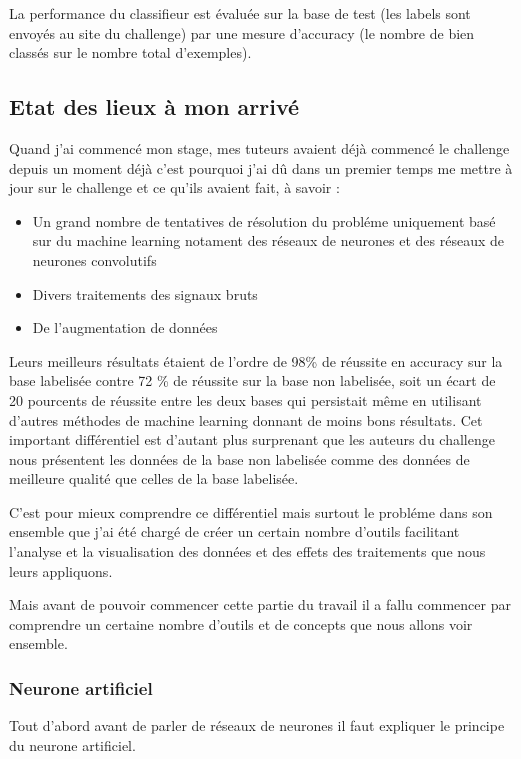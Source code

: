 La performance du classifieur est évaluée sur la base de test (les labels sont envoyés au site du challenge) par une mesure d'accuracy (le nombre de bien classés sur le nombre total d'exemples).

\hypertarget{Etat-des-lieux-lors-de-mon-arrivuxe9}{%
\subsection{Etat des lieux à mon arrivé}
\label{Etat-des-lieux-lors-de-mon-arrivuxe9}}

Quand j'ai commencé mon stage, mes tuteurs avaient déjà commencé le challenge depuis un moment déjà c'est pourquoi j'ai dû dans un premier temps me mettre à jour sur le challenge et ce qu'ils avaient fait, à savoir :
\begin{itemize}
\item Un grand nombre de tentatives de résolution du probléme uniquement basé sur du machine learning notament des réseaux de neurones et des réseaux de neurones convolutifs
\item Divers traitements des signaux bruts
\item De l'augmentation de données
\end{itemize}



Leurs meilleurs résultats étaient de l'ordre de 98\% de réussite en accuracy sur la base labelisée contre 72 \% de réussite sur la base non labelisée, soit un écart de 20 pourcents de réussite entre les deux bases qui persistait même en utilisant d'autres méthodes de machine learning donnant de moins bons résultats.
Cet important différentiel est d'autant plus surprenant que les auteurs du challenge nous présentent les données de la base non labelisée comme des données de meilleure qualité que celles de la base labelisée.

C'est pour mieux comprendre ce différentiel mais surtout le probléme dans son ensemble que j'ai été chargé de créer un certain nombre d'outils facilitant l'analyse et la visualisation des données et des effets des traitements que nous leurs appliquons.

Mais avant de pouvoir commencer cette partie du travail il a fallu commencer par comprendre un certaine nombre d'outils et de concepts que nous allons voir ensemble.


\hypertarget{Neurone-artificiel}{%
\subsubsection{Neurone artificiel}
\label{Neurone-artificiel}}
Tout d'abord avant de parler de réseaux de neurones il faut expliquer le principe du neurone artificiel.

